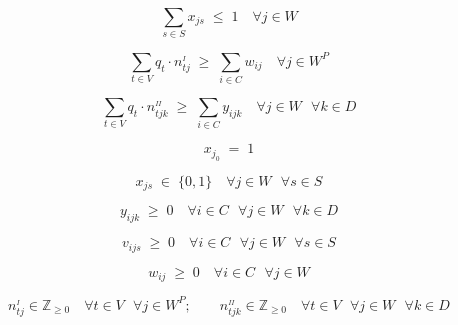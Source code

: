 \documentclass[fleqn, 11pt,letterpaper]{article}
\begin{document}
\begin{equation}
    \label{eq:tamaño}
    \sum\limits_{s \in S} x_{js} \; \leq \; 1 \quad
        \forall j \in W
\end{equation}

\begin{equation}
    \label{eq:vehiculos1}
    \sum\limits_{t \in V} q_t \!\cdot n^{_I}_{tj} \; \geq \; \sum\limits_{i \in C} w_{ij} \quad
        \forall j \in W^{P}
\end{equation}

\begin{equation}
    \label{eq:vehiculos2}
    \sum\limits_{t \in V} q_t \!\cdot n^{_{II}}_{tjk} \; \geq \; \sum\limits_{i \in C} y_{ijk} \quad
        \forall j \in W\:\:\:
        \forall k \in D
\end{equation}

\begin{equation}
    \label{eq:fijos}
    x_{j_0} \; = \; 1
\end{equation}

\begin{equation}
    \label{eq:dom_x}
    x_{js} \; \in \; \{0,1\} \quad
        \forall j \in W\:\:\:
        \forall s \in S
\end{equation}

\begin{equation}
    \label{eq:dom_y}
    y_{ijk} \; \geq \; 0 \quad
        \forall i \in C\:\:\:
        \forall j \in W\:\:\:
        \forall k \in D
\end{equation}

\begin{equation}
    \label{eq:dom_v}
    v_{ijs} \; \geq \; 0 \quad
        \forall i \in C\:\:\:
        \forall j \in W\:\:\:
        \forall s \in S
\end{equation}

\begin{equation}
    \label{eq:dom_w}
    w_{ij} \; \geq \; 0 \quad
        \forall i \in C\:\:\:
        \forall j \in W
\end{equation}

\begin{equation}
    \label{eq:dom_n}
    n^{_I}_{tj} \in \mathbb{Z}_{\geq 0} \quad \forall t \in V\:\:\: \forall j \in W^{P};
    \qquad
    n^{_{II}}_{tjk} \in \mathbb{Z}_{\geq 0} \quad \forall t \in V\:\:\: \forall j \in W\:\:\: \forall k \in D
\end{equation}
\end{document}
